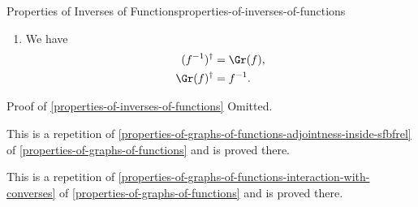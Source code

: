 \begin{proposition}{Properties of Inverses of Functions}{properties-of-inverses-of-functions}
\begin{enumerate}
            in $\sfbfRel$.
        \item\label{properties-of-inverses-of-functions-interaction-with-converses-of-relations}We have
            \begin{align*}
                (f^{-1})^{\dagger} &= \Gr(f),\\
                \Gr(f)^{\dagger}   &= f^{-1}.
            \end{align*}
    \end{enumerate}
\end{proposition}
\begin{Proof}{Proof of \cref{properties-of-inverses-of-functions}}%
    Omitted.

    This is a repetition of \cref{properties-of-graphs-of-functions-adjointness-inside-sfbfrel} of \cref{properties-of-graphs-of-functions} and is proved there.

    This is a repetition of \cref{properties-of-graphs-of-functions-interaction-with-converses} of \cref{properties-of-graphs-of-functions} and is proved there.
\end{Proof}
